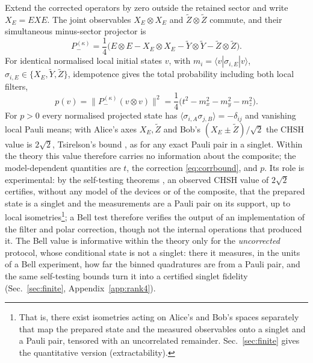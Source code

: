\documentclass[11pt,a4paper]{article}
\newcommand{\ket}[1]{|#1\rangle}
\newcommand{\bra}[1]{\langle#1|}
\newcommand{\Zt}{\widetilde Z}
\newcommand{\Yt}{\widetilde Y}
\begin{document}
Extend the corrected operators by zero outside the retained sector and write $X_E=EXE$. The joint observables $X_E\otimes X_E$ and $\Zt\otimes\Zt$ commute, and their simultaneous minus-sector projector is
\begin{equation}
P_-^{(\kappa)}=\frac14\big(E\otimes E-X_E\otimes X_E-\Yt\otimes\Yt-\Zt\otimes\Zt\big).
\label{eq:Pminus}
\end{equation}
For identical normalised local initial states $v$, with $m_i=\bra v\sigma_{i,E}\ket v$, $\sigma_{i,E}\in\{X_E,\Yt,\Zt\}$, idempotence gives the total probability including both local filters,
\begin{equation}
p(v)=\big\|P_-^{(\kappa)}(v\otimes v)\big\|^2=\frac14\big(t^2-m_x^2-m_y^2-m_z^2\big).
\label{eq:pv}
\end{equation}
For $p>0$ every normalised projected state has $\langle\sigma_{i,A}\sigma_{j,B}\rangle=-\delta_{ij}$ and vanishing local Pauli means; with Alice's axes $X_E,\Zt$ and Bob's $(X_E\pm\Zt)/\sqrt2$ the CHSH value \cite{CHSH1969} is $2\sqrt2$, Tsirelson's bound \cite{Cirelson1980}, as for any exact Pauli pair in a singlet. Within the theory this value therefore carries no information about the composite; the model-dependent quantities are $t$, the correction \eqref{eq:corrbound}, and $p$. Its role is experimental: by the self-testing theorems \cite{Kaniewski2016,Supic2020}, an observed CHSH value of $2\sqrt2$ certifies, without any model of the devices or of the composite, that the prepared state is a singlet and the measurements are a Pauli pair on its support, up to local isometries\footnote{That is, there exist isometries acting on Alice's and Bob's spaces separately that map the prepared state and the measured observables onto a singlet and a Pauli pair, tensored with an uncorrelated remainder. Sec.~\ref{sec:finite} gives the quantitative version (extractability).}; a Bell test therefore verifies the output of an implementation of the filter and polar correction, though not the internal operations that produced it. The Bell value is informative within the theory only for the \emph{uncorrected} protocol, whose conditional state is not a singlet: there it measures, in the units of a Bell experiment, how far the binned quadratures are from a Pauli pair, and the same self-testing bounds turn it into a certified singlet fidelity (Sec.~\ref{sec:finite}, Appendix~\ref{app:rank4}).
\end{document}
